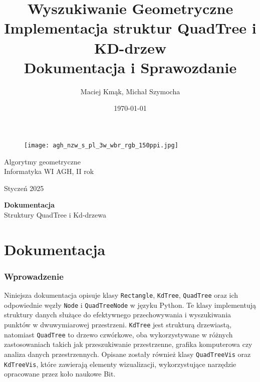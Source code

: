 \documentclass[12pt]{article}
\title{%
  \textbf{\Huge Wyszukiwanie Geometryczne} \\ 
  \LARGE Implementacja struktur QuadTree i KD-drzew \\ 
  \Large Dokumentacja i Sprawozdanie}
\author{Maciej Kmąk, Michał Szymocha}
\date{\today}
\begin{document}
\begin{figure}
    \centering
    \texttt{[image: agh\_nzw\_s\_pl\_3w\_wbr\_rgb\_150ppi.jpg]}
    \label{fig:agh}
\end{figure}
\maketitle

{\centering Algorytmy geometryczne \\
Informatyka WI AGH, II rok \\ } 

{\centering \Large\theauthor\par}

{\centering \Large {Styczeń 2025} \par}
\thispagestyle{plain}

\newpage
\pagestyle{spis}
\small\tableofcontents


\newpage

\thispagestyle{empty} %
\vspace*{\fill} %
\begin{center}
    {\textbf{\Huge Dokumentacja} \\ 
    \LARGE Struktury QuadTree i Kd-drzewa \\ }
\end{center}
\vspace*{\fill} %


\newpage
\pagestyle{dokumentacja}
\part{Dokumentacja}
\section{Wprowadzenie}

Niniejsza dokumentacja opisuje klasy \texttt{Rectangle}, \texttt{KdTree}, \texttt{QuadTree} oraz ich odpowiednie węzły \texttt{Node} i \texttt{QuadTreeNode} w języku Python. Te klasy implementują struktury danych służące do efektywnego przechowywania i wyszukiwania punktów w dwuwymiarowej przestrzeni. \texttt{KdTree} jest strukturą drzewiastą, natomiast \texttt{QuadTree} to drzewo czwórkowe, oba wykorzystywane w różnych zastosowaniach takich jak przeszukiwanie przestrzenne, grafika komputerowa czy analiza danych przestrzennych. Opisane zostały również klasy \texttt{QuadTreeVis} oraz \texttt{KdTreeVis}, które zawierają elementy wizualizacji, wykorzystujące narzędzie opracowane przez koło naukowe Bit.
\end{document}
